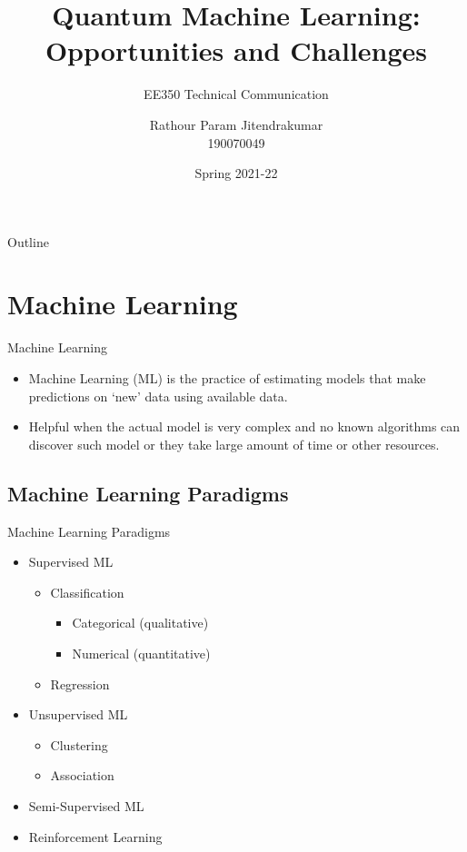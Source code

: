 \documentclass[aspectratio=169, handout]{beamer}
\title[Quantum Machine Learning]{Quantum Machine Learning: Opportunities and Challenges}
\subtitle{EE350 Technical Communication}
\author[Param]{Rathour Param Jitendrakumar\\190070049}
\institute[IIT Bombay]{Department of Electrical Engineering\\
Indian Institue of Technology Bombay} %
\date{Spring 2021-22}
\theoremstyle{example}
\begin{document}
\begin{frame}
  \titlepage
\end{frame}

\begin{frame}{Outline}
  \tableofcontents
\end{frame}

\section{Machine Learning}

\begin{frame}{Machine Learning}
  \begin{itemize}
  \pause\item {
    Machine Learning (ML) is the practice of estimating models that make predictions on `new' data using available data. 
  }
  \pause\item {
    Helpful when the actual model is very complex and no known algorithms can discover such model or they take large amount of time or other resources.
  }
  \end{itemize}
\end{frame}
\subsection{Machine Learning Paradigms}
\begin{frame}{Machine Learning Paradigms}
  \begin{itemize}
  \pause\item {
    Supervised ML
    \begin{itemize}
    \pause\item {Classification
    \begin{itemize}
    \pause\item {Categorical (qualitative)
    }
    \pause\item {Numerical (quantitative)
    }
    \end{itemize}
    }
    \pause\item {Regression
    }
    \end{itemize}
  }
  \pause\item {Unsupervised ML
    \begin{itemize}
    \pause\item {Clustering
    }
    \pause\item {Association
    }
    \end{itemize}
  }
  \pause\item {Semi-Supervised ML
  }
  \pause\item {Reinforcement Learning
  }
  \end{itemize}
\end{frame}
\end{document}

